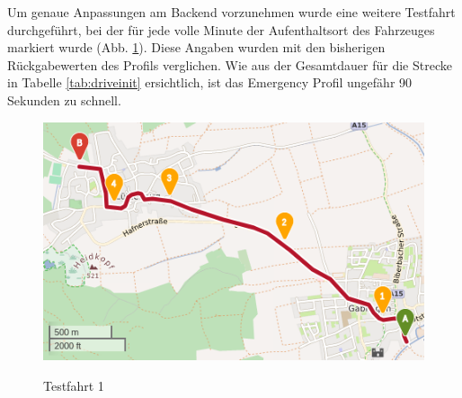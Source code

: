 Um genaue Anpassungen am Backend vorzunehmen wurde eine weitere Testfahrt durchgeführt, bei der für jede volle Minute der Aufenthaltsort des Fahrzeuges markiert wurde (Abb. \ref{fig:drive1}).
Diese Angaben wurden mit den bisherigen Rückgabewerten des Profils verglichen.
Wie aus der Gesamtdauer für die Strecke in Tabelle \ref{tab:driveinit} ersichtlich, ist das Emergency Profil ungefähr 90 Sekunden zu schnell.

\begin{figure}[h]
\centering
\includegraphics[width = 0.7 \textwidth]{../media/Fahrt1.png} \\
\caption{Testfahrt 1}
\label{fig:drive1}
\end{figure}

